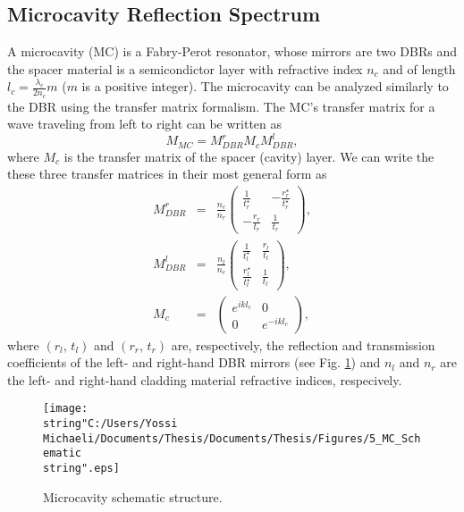 \subsection{Microcavity Reflection Spectrum }

A microcavity (MC) is a Fabry-Perot resonator, whose mirrors are two
DBRs and the spacer material is a semicondictor layer with refractive
index $n_{c}$ and of length $l_{c}=\frac{\lambda_{c}}{2n_{c}}m$
($m$ is a positive integer). The microcavity can be analyzed similarly
to the DBR using the transfer matrix formalism. The MC's transfer
matrix for a wave traveling from left to right can be written as \begin{equation}
M_{MC}=M_{DBR}^{r}M_{c}M_{DBR}^{l},\label{eq:MC_transfer_matrix_1}\end{equation}
where $M_{c}$ is the transfer matrix of the spacer (cavity) layer.
We can write the these three transfer matrices in their most general
form as\begin{eqnarray}
M_{DBR}^{r} & = & \frac{n_{c}}{n_{r}}\left(\begin{array}{cc}
\frac{1}{t_{r}^{\star}} & -\frac{r_{r}^{\star}}{t_{r}^{\star}}\\
-\frac{r_{r}}{t_{r}} & \frac{1}{t_{r}}\end{array}\right),\\
M_{DBR}^{l} & = & \frac{n_{l}}{n_{c}}\left(\begin{array}{cc}
\frac{1}{t_{l}^{\star}} & \frac{r_{l}}{t_{l}}\\
\frac{r_{l}^{\star}}{t_{l}^{\star}} & \frac{1}{t_{l}}\end{array}\right),\\
M_{c} & = & \left(\begin{array}{cc}
e^{ikl_{c}} & 0\\
0 & e^{-ikl_{c}}\end{array}\right),\end{eqnarray}
where $\left(r_{l},\, t_{l}\right)$ and $\left(r_{r},\, t_{r}\right)$
are, respectively, the reflection and transmission coefficients of
the left- and right-hand DBR mirrors (see Fig. \ref{fig:Microcavity_schematic_structure})
and $n_{l}$ and $n_{r}$ are the left- and right-hand cladding material
refractive indices, respecively.

%
\begin{figure}
\begin{centering}
\texttt{[image: \\string"C:/Users/Yossi Michaeli/Documents/Thesis/Documents/Thesis/Figures/5\_MC\_Schematic\\string".eps]}
\par\end{centering}

\caption{\label{fig:Microcavity_schematic_structure}Microcavity schematic
structure.}



\end{figure}



